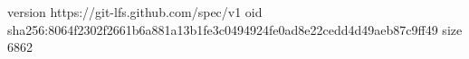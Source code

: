 version https://git-lfs.github.com/spec/v1
oid sha256:8064f2302f2661b6a881a13b1fe3c0494924fe0ad8e22cedd4d49aeb87c9ff49
size 6862
